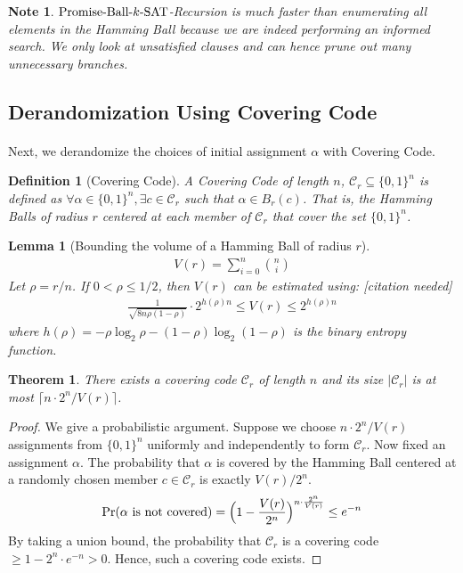 \documentclass[a4paper,12pts]{article}
\newcommand{\SAT}{\textnormal{$k$-SAT}}
\newcommand{\ball}[2]{B_{#1}(#2)}
\newcommand{\PBS}{\textnormal{Promise-Ball-$\SAT$}}
\newcommand{\cc}{\mathcal{C}}
\newcommand{\bits}{\{0,1\}}
\renewcommand{\Pr}{\textnormal{Pr}}
\newtheorem{definition}{Definition}
\newtheorem{theorem}{Theorem}
\newtheorem*{note}{Note}
\newtheorem{lemma}{Lemma}
\begin{document}
\begin{note}
	$\PBS$-Recursion is much faster than enumerating all elements in the Hamming Ball because we are indeed performing an informed search. We only look at unsatisfied clauses and can hence prune out many unnecessary branches.
\end{note}
\subsection{Derandomization Using Covering Code}
\paragraph{} Next, we derandomize the choices of initial assignment $\alpha$ with Covering Code. \par 
\begin{definition}[Covering Code]
	A Covering Code of length $n$, $\cc_r \subseteq \bits^n$ is defined as $\forall \alpha \in \bits^n, \exists c \in \cc_r$ such that $\alpha \in \ball{r}{c}$. That is, the Hamming Balls of radius $r$ centered at each member of $\cc_r$ that cover the set $\bits^n$.
\end{definition}
\begin{lemma}[Bounding the volume of a Hamming Ball of radius $r$]
	\begin{align*}
	V(r) = \sum_{i = 0}^{n} {n \choose i}
	\end{align*}
	Let $\rho = r/n$. If $0 < \rho \leq 1/2$, then $V(r)$ can be estimated using: [citation needed]
	\begin{align*}
	\frac{1}{\sqrt{8n\rho(1-\rho)}} \cdot 2^{h(\rho)n} \leq V(r) \leq 2^{h(\rho)n}
	\end{align*}
	where $h(\rho) = -\rho \log_2 \rho - (1-\rho)\log_2(1-\rho)$ is the binary entropy function.
\end{lemma}
\begin{theorem}
	There exists a covering code $\cc_r$ of length $n$ and its size $|\cc_r|$ is at most $\lceil n\cdot 2^n / V(r) \rceil$.
\end{theorem}
\begin{proof}
	We give a probabilistic argument. Suppose we choose $ n\cdot 2^n / V(r)$ assignments from $\bits^n$ uniformly and independently to form $\cc_r$. Now fixed an assignment $\alpha$. The probability that $\alpha$ is covered by the Hamming Ball centered at a randomly chosen member $c \in \cc_r$ is exactly $V(r)/2^n$. 
	\begin{align*}
	\Pr(\text{$\alpha$ is not covered}) = \Big(1-\frac{V(r)}{2^n}\Big)^{n\cdot \frac{2^n}{V(r)}} \leq e^{-n}
	\end{align*}
	By taking a union bound, the probability that $\cc_r$ is a covering code $\geq 1 - 2^n\cdot e^{-n} > 0$. Hence, such a covering code exists. 
\end{proof}
\end{document}
